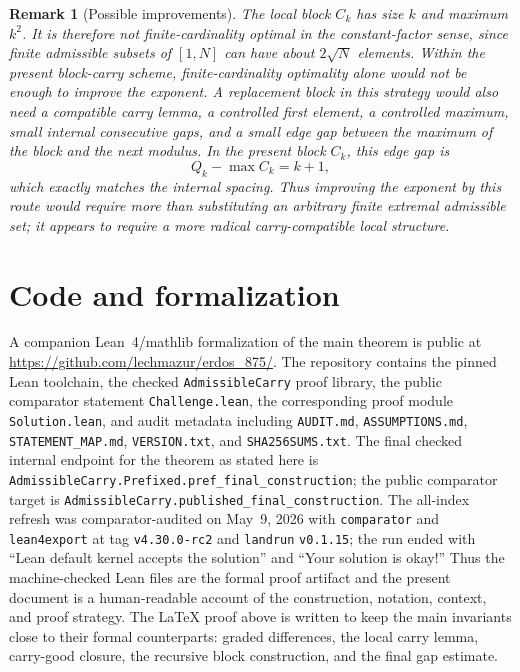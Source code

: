 \documentclass[11pt]{article}
\newtheorem{remark}{Remark}
\begin{document}
\begin{remark}[Possible improvements]\label{rem:improvements}
The local block $C_k$ has size $k$ and maximum $k^2$.  It is therefore not finite-cardinality optimal in the constant-factor sense, since finite admissible subsets of $[1,N]$ can have about $2\sqrt N$ elements.  Within the present block-carry scheme, finite-cardinality optimality alone would not be enough to improve the exponent.  A replacement block in this strategy would also need a compatible carry lemma, a controlled first element, a controlled maximum, small internal consecutive gaps, and a small edge gap between the maximum of the block and the next modulus.  In the present block $C_k$, this edge gap is
\[
        Q_k-\max C_k=k+1,
\]
which exactly matches the internal spacing.  Thus improving the exponent by this route would require more than substituting an arbitrary finite extremal admissible set; it appears to require a more radical carry-compatible local structure.
\end{remark}

\section*{Code and formalization}

A companion Lean~4/mathlib formalization of the main theorem is public at
\url{https://github.com/lechmazur/erdos_875/}.  The repository contains the pinned Lean toolchain, the checked \texttt{AdmissibleCarry} proof library, the public comparator statement \texttt{Challenge.lean}, the corresponding proof module \texttt{Solution.lean}, and audit metadata including \texttt{AUDIT.md}, \texttt{ASSUMPTIONS.md}, \texttt{STATEMENT\_MAP.md}, \texttt{VERSION.txt}, and \texttt{SHA256SUMS.txt}.  The final checked internal endpoint for the theorem as stated here is \texttt{AdmissibleCarry.Prefixed.pref\_final\_construction}; the public comparator target is \texttt{AdmissibleCarry.published\_final\_construction}.  The all-index refresh was comparator-audited on May~9, 2026 with \texttt{comparator} and \texttt{lean4export} at tag \texttt{v4.30.0-rc2} and \texttt{landrun} \texttt{v0.1.15}; the run ended with ``Lean default kernel accepts the solution'' and ``Your solution is okay!''  Thus the machine-checked Lean files are the formal proof artifact and the present document is a human-readable account of the construction, notation, context, and proof strategy.  The LaTeX proof above is written to keep the main invariants close to their formal counterparts: graded differences, the local carry lemma, carry-good closure, the recursive block construction, and the final gap estimate.
\end{document}
